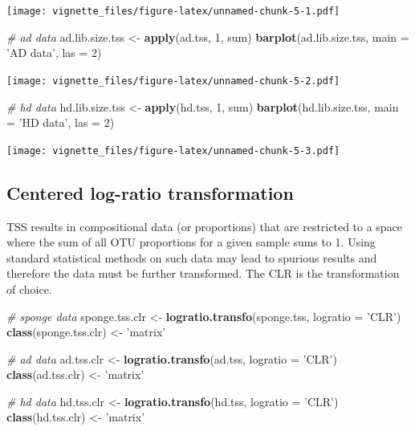 \documentclass[]{book}
\newenvironment{Shaded}{\begin{snugshade}}{\end{snugshade}}
\newcommand{\KeywordTok}[1]{\textcolor[rgb]{0.13,0.29,0.53}{\textbf{#1}}}
\newcommand{\DataTypeTok}[1]{\textcolor[rgb]{0.13,0.29,0.53}{#1}}
\newcommand{\DecValTok}[1]{\textcolor[rgb]{0.00,0.00,0.81}{#1}}
\newcommand{\StringTok}[1]{\textcolor[rgb]{0.31,0.60,0.02}{#1}}
\newcommand{\CommentTok}[1]{\textcolor[rgb]{0.56,0.35,0.01}{\textit{#1}}}
\newcommand{\NormalTok}[1]{#1}
\begin{document}
\texttt{[image: vignette\_files/figure-latex/unnamed-chunk-5-1.pdf]}

\begin{Shaded}
\begin{Highlighting}[]
\CommentTok{# ad data}
\NormalTok{ad.lib.size.tss <-}\StringTok{ }\KeywordTok{apply}\NormalTok{(ad.tss, }\DecValTok{1}\NormalTok{, sum)}
\KeywordTok{barplot}\NormalTok{(ad.lib.size.tss, }\DataTypeTok{main =}  \StringTok{'AD data'}\NormalTok{, }\DataTypeTok{las =} \DecValTok{2}\NormalTok{)}
\end{Highlighting}
\end{Shaded}

\texttt{[image: vignette\_files/figure-latex/unnamed-chunk-5-2.pdf]}

\begin{Shaded}
\begin{Highlighting}[]
\CommentTok{# hd data}
\NormalTok{hd.lib.size.tss <-}\StringTok{ }\KeywordTok{apply}\NormalTok{(hd.tss, }\DecValTok{1}\NormalTok{, sum)}
\KeywordTok{barplot}\NormalTok{(hd.lib.size.tss, }\DataTypeTok{main =}  \StringTok{'HD data'}\NormalTok{, }\DataTypeTok{las =} \DecValTok{2}\NormalTok{)}
\end{Highlighting}
\end{Shaded}

\texttt{[image: vignette\_files/figure-latex/unnamed-chunk-5-3.pdf]}

\subsection{Centered log-ratio
transformation}\label{centered-log-ratio-transformation}

TSS results in compositional data (or proportions) that are restricted
to a space where the sum of all OTU proportions for a given sample sums
to 1. Using standard statistical methods on such data may lead to
spurious results and therefore the data must be further transformed. The
CLR is the transformation of choice.

\begin{Shaded}
\begin{Highlighting}[]
\CommentTok{# sponge data}
\NormalTok{sponge.tss.clr <-}\StringTok{ }\KeywordTok{logratio.transfo}\NormalTok{(sponge.tss, }\DataTypeTok{logratio =} \StringTok{'CLR'}\NormalTok{)}
\KeywordTok{class}\NormalTok{(sponge.tss.clr) <-}\StringTok{ 'matrix'} 

\CommentTok{# ad data}
\NormalTok{ad.tss.clr <-}\StringTok{ }\KeywordTok{logratio.transfo}\NormalTok{(ad.tss, }\DataTypeTok{logratio =} \StringTok{'CLR'}\NormalTok{)}
\KeywordTok{class}\NormalTok{(ad.tss.clr) <-}\StringTok{ 'matrix'} 

\CommentTok{# hd data}
\NormalTok{hd.tss.clr <-}\StringTok{ }\KeywordTok{logratio.transfo}\NormalTok{(hd.tss, }\DataTypeTok{logratio =} \StringTok{'CLR'}\NormalTok{)}
\KeywordTok{class}\NormalTok{(hd.tss.clr) <-}\StringTok{ 'matrix'}
\end{Highlighting}
\end{Shaded}
\end{document}
